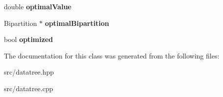 \begin{DoxyCompactItemize}
\item 
\hypertarget{classDatatree_ab05119987fb8d744edd73177a8afd4dc}{double {\bfseries optimal\-Value}}\label{classDatatree_ab05119987fb8d744edd73177a8afd4dc}

\item 
\hypertarget{classDatatree_af77422049ff1cd38f8bff3258df2f6f2}{Bipartition $\ast$ {\bfseries optimal\-Bipartition}}\label{classDatatree_af77422049ff1cd38f8bff3258df2f6f2}

\item 
\hypertarget{classDatatree_a6255f63e818a66b3b0e15c395bae06fb}{bool {\bfseries optimized}}\label{classDatatree_a6255f63e818a66b3b0e15c395bae06fb}

\end{DoxyCompactItemize}


The documentation for this class was generated from the following files\-:\begin{DoxyCompactItemize}
\item 
src/datatree.\-hpp\item 
src/datatree.\-cpp\end{DoxyCompactItemize}
